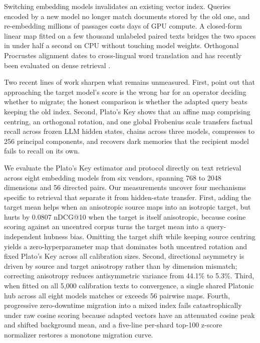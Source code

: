 \documentclass{article}
\begin{document}
Switching embedding models invalidates an existing vector index. Queries encoded by a new model no longer match documents stored by the old one, and re-embedding millions of passages costs days of GPU compute. A closed-form linear map fitted on a few thousand unlabeled paired texts bridges the two spaces in under half a second on CPU without touching model weights. Orthogonal Procrustes alignment dates to cross-lingual word translation \citep{conneau2018word,artetxe2018vecmap} and has recently been evaluated on dense retrieval \citep{vejendla2025drift,zhao2026bill,xiao2026adapters}.

Two recent lines of work sharpen what remains unmeasured. First, \citet{zhao2026bill} point out that approaching the target model's score is the wrong bar for an operator deciding whether to migrate; the honest comparison is whether the adapted query beats keeping the old index. Second, Plato's Key \citep{platoskey2026} shows that an affine map comprising centring, an orthogonal rotation, and one global Frobenius scale transfers factual recall across frozen LLM hidden states, chains across three models, compresses to 256 principal components, and recovers dark memories that the recipient model fails to recall on its own.

We evaluate the Plato's Key estimator and protocol directly on text retrieval across eight embedding models from six vendors, spanning 768 to 2048 dimensions and 56 directed pairs. Our measurements uncover four mechanisms specific to retrieval that separate it from hidden-state transfer. First, adding the target mean helps when an anisotropic source maps into an isotropic target, but hurts by 0.0807 nDCG@10 when the target is itself anisotropic, because cosine scoring against an uncentred corpus turns the target mean into a query-independent hubness bias. Omitting the target shift while keeping source centring yields a zero-hyperparameter map that dominates both uncentred rotation and fixed Plato's Key across all calibration sizes. Second, directional asymmetry is driven by source and target anisotropy rather than by dimension mismatch; correcting anisotropy reduces antisymmetric variance from 44.1\% to 5.3\%. Third, when fitted on all 5{,}000 calibration texts to convergence, a single shared Platonic hub across all eight models matches or exceeds 56 pairwise maps. Fourth, progressive zero-downtime migration into a mixed index fails catastrophically under raw cosine scoring because adapted vectors have an attenuated cosine peak and shifted background mean, and a five-line per-shard top-100 z-score normalizer restores a monotone migration curve.
\end{document}
